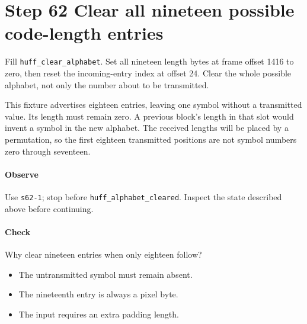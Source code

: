 \section{Step 62 Clear all nineteen possible code-length entries}\label{png-huff-s62}
Fill \texttt{huff\_clear\_alphabet}. Set all nineteen length bytes at frame offset 1416 to zero, then reset the incoming-entry index at offset 24. Clear the whole possible alphabet, not only the number about to be transmitted.

This fixture advertises eighteen entries, leaving one symbol without a transmitted value. Its length must remain zero. A previous block's length in that slot would invent a symbol in the new alphabet. The received lengths will be placed by a permutation, so the first eighteen transmitted positions are not symbol numbers zero through seventeen.

\paragraph{Observe} Use \texttt{s62-1}; stop before \texttt{huff\_alphabet\_cleared}. Inspect the state described above before continuing.

\paragraph{Check} Why clear nineteen entries when only eighteen follow?
\begin{itemize}
\item[A.] The untransmitted symbol must remain absent.
\item[B.] The nineteenth entry is always a pixel byte.
\item[C.] The input requires an extra padding length.
\end{itemize}
